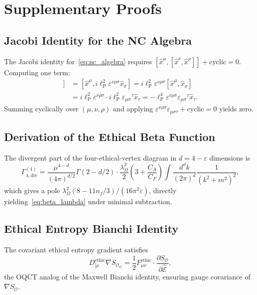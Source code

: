 \documentclass[12pt,a4paper]{article}
\theoremstyle{myrmk}
\newcommand{\SO}{\nabla S_{\!\mathcal{O}}}
\newcommand{\lP}{\ell_{\mathrm{P}}}
\begin{document}
\appendix
\section{Supplementary Proofs}
\label{app:proofs}

\subsection{Jacobi Identity for the NC Algebra}

The Jacobi identity for~\eqref{eq:nc_algebra} requires
$[\hat{x}^\mu,[\hat{x}^\nu,\hat{x}^\rho]]+\text{cyclic}=0$.
Computing one term:
\begin{align}
  [\hat{x}^\mu,[\hat{x}^\nu,\hat{x}^\rho]]
  &= [\hat{x}^\mu,i\lP^2\varepsilon^{\nu\rho\sigma}\hat{x}_\sigma]
   = i\lP^2\varepsilon^{\nu\rho\sigma}[\hat{x}^\mu,\hat{x}_\sigma]\nonumber\\
  &= i\lP^2\varepsilon^{\nu\rho\sigma}\cdot i\lP^2\varepsilon_{\mu\sigma}{}^\tau\hat{x}_\tau
   = -\lP^4\varepsilon^{\nu\rho\sigma}\varepsilon_{\mu\sigma}{}^\tau\hat{x}_\tau.
\end{align}
Summing cyclically over $(\mu,\nu,\rho)$ and applying
$\varepsilon^{\nu\rho\sigma}\varepsilon_{\mu\sigma\tau}+\text{cyclic}=0$ yields zero.

\subsection{Derivation of the Ethical Beta Function}

The divergent part of the four-ethical-vertex diagram in $d=4-\varepsilon$ dimensions is
\begin{equation}
  \Gamma_{\lambda,\text{div}}^{(4)}
  = \frac{\mu^{4-d}}{(4\pi)^{d/2}}\Gamma(2-d/2)
    \cdot\frac{\lambda_\Omega^2}{2}\!\left(3+\frac{C_A}{C_F}\right)
    \int\frac{d^dk}{(2\pi)^d}\frac{1}{(k^2+m^2)^2},
\end{equation}
which gives a pole $\lambda_\Omega^2(8-11n_f/3)/(16\pi^2\varepsilon)$,
directly yielding~\eqref{eq:beta_lambda} under minimal subtraction.

\subsection{Ethical Entropy Bianchi Identity}

The covariant ethical entropy gradient satisfies
\begin{equation}
  D^\mathrm{ethic}_{[\mu}\SO_{\nu]}
  = \frac{1}{2}F^{\mathrm{ethic}}_{\mu\nu}\cdot\frac{\partial S_{\mathcal{O}}}{\partial\hat{\mathcal{E}}},
\end{equation}
the OQCT analog of the Maxwell Bianchi identity, ensuring gauge covariance of $\SO$.
\end{document}
